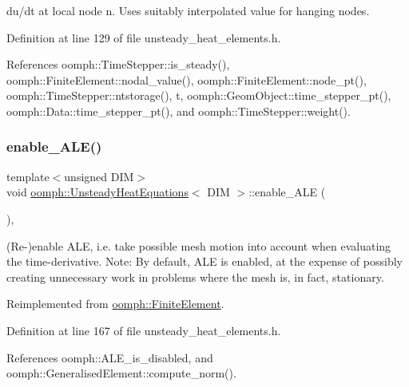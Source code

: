 du/dt at local node n. Uses suitably interpolated value for hanging nodes. 



Definition at line 129 of file unsteady\+\_\+heat\+\_\+elements.\+h.



References oomph\+::\+Time\+Stepper\+::is\+\_\+steady(), oomph\+::\+Finite\+Element\+::nodal\+\_\+value(), oomph\+::\+Finite\+Element\+::node\+\_\+pt(), oomph\+::\+Time\+Stepper\+::ntstorage(), t, oomph\+::\+Geom\+Object\+::time\+\_\+stepper\+\_\+pt(), oomph\+::\+Data\+::time\+\_\+stepper\+\_\+pt(), and oomph\+::\+Time\+Stepper\+::weight().

\mbox{\label{classoomph_1_1UnsteadyHeatEquations_a38abdb9f1afd465289bb31d684daa360}} 
\subsubsection{\texorpdfstring{enable\+\_\+\+A\+L\+E()}{enable\_ALE()}}
{\footnotesize\ttfamily template$<$unsigned D\+IM$>$ \\
void \hyperlink{classoomph_1_1UnsteadyHeatEquations}{oomph\+::\+Unsteady\+Heat\+Equations}$<$ D\+IM $>$\+::enable\+\_\+\+A\+LE (\begin{DoxyParamCaption}{ }\end{DoxyParamCaption})\hspace{0.3cm}{\ttfamily [inline]}, {\ttfamily [virtual]}}



(Re-\/)enable A\+LE, i.\+e. take possible mesh motion into account when evaluating the time-\/derivative. Note\+: By default, A\+LE is enabled, at the expense of possibly creating unnecessary work in problems where the mesh is, in fact, stationary. 



Reimplemented from \hyperlink{classoomph_1_1FiniteElement_a92ef8967fa4e2d6c33c51ea3efa3aa82}{oomph\+::\+Finite\+Element}.



Definition at line 167 of file unsteady\+\_\+heat\+\_\+elements.\+h.



References oomph\+::\+A\+L\+E\+\_\+is\+\_\+disabled, and oomph\+::\+Generalised\+Element\+::compute\+\_\+norm().

